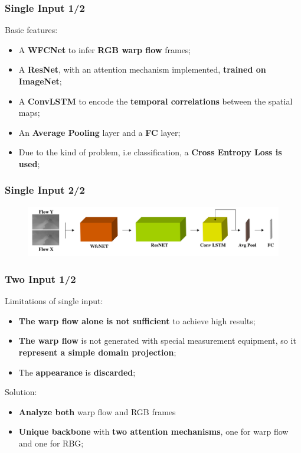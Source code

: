 \documentclass{beamer}
\begin{document}
\begin{frame}
\frametitle{Single Input 1/2}

Basic features:
\begin{itemize}
\item A \textbf{WFCNet} to infer \textbf{RGB warp flow} frames;
\item A \textbf{ResNet}, with an attention mechanism implemented, \textbf{trained on ImageNet};
\item A \textbf{ConvLSTM} to encode the \textbf{temporal correlations} between the spatial maps; %
\item An \textbf{Average Pooling} layer and a \textbf{FC} layer;
\item Due to the kind of problem, i.e classification, a \textbf{Cross Entropy Loss is used};
\end{itemize}
 
\end{frame}

\begin{frame}
\frametitle{Single Input 2/2}

\begin{figure}
\centering
\includegraphics[width=\textwidth]{./schemi/single_stream}
\end{figure}
 
\end{frame}

\begin{frame}
\frametitle{Two Input 1/2}
Limitations of single input:
\begin{itemize}
\item \textbf{The warp flow alone is not sufficient} to achieve high results;
\item \textbf{The warp flow} is not generated with special measurement equipment, so it \textbf{represent a simple domain projection};
\item The \textbf{appearance} is \textbf{discarded};
\end{itemize}

Solution:
\begin{itemize}
\item \textbf{Analyze both} warp flow and RGB frames
\item \textbf{Unique backbone} with \textbf{two attention mechanisms}, one for warp flow and one for RBG;
\end{itemize}
\end{frame}
\end{document}
